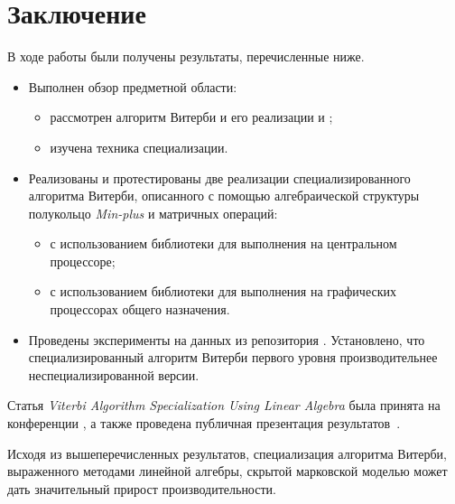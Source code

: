\newpage
\section{Заключение}
В ходе работы были получены результаты, перечисленные ниже.
\begin{itemize}
	\item Выполнен обзор предметной области:
		\begin{itemize}
			\item рассмотрен алгоритм Витерби и его реализации  и ;
			\item изучена техника специализации.
		\end{itemize}
	\item Реализованы и протестированы две реализации специализированного алгоритма Витерби, описанного с помощью алгебраической структуры полукольцо \emph{Min-plus} и матричных операций:
		\begin{itemize}
			\item с использованием библиотеки  для выполнения на центральном процессоре;
			\item с использованием библиотеки  для выполнения на графических процессорах общего назначения.
		\end{itemize}
	\item Проведены эксперименты на данных из репозитория . 
Установлено, что специализированный алгоритм Витерби первого уровня производительнее неспециализированной версии.
\end{itemize}

Статья \emph{Viterbi Algorithm Specialization Using Linear 
Algebra} была принята на конференции , а 
также проведена публичная презентация результатов~\cite{paper}.

Исходя из вышеперечисленных результатов, специализация 
алгоритма Витерби, выраженного методами линейной алгебры, 
скрытой марковской моделью может дать значительный прирост 
производительности.
